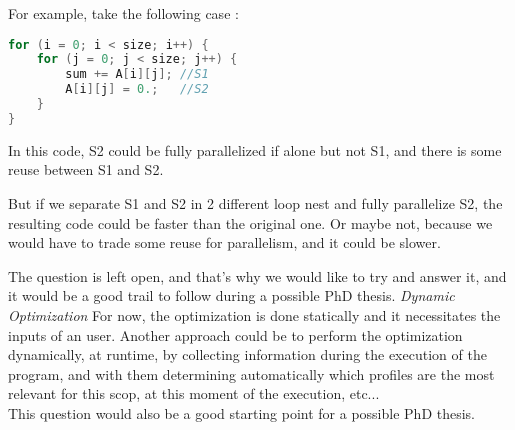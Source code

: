 \documentclass[paper=a4, fontsize=11.5pt]{scrartcl}
\numberwithin{equation}{section}        %
\numberwithin{figure}{section}          %
\numberwithin{table}{section}               %
\begin{document}
        For example, take the following case :
\begin{lstlisting}[frame=single, language=C, caption={Statements Separation example}, label={lst:stmt_sep_example}]
for (i = 0; i < size; i++) {
    for (j = 0; j < size; j++) {
        sum += A[i][j]; //S1
        A[i][j] = 0.;   //S2
    }
}
\end{lstlisting}
        In this code, S2 could be fully parallelized if alone but not S1, and there is
        some reuse between S1 and S2.

        But if we separate S1 and S2 in 2 different loop nest and fully parallelize S2,
        the resulting code could be faster than the original one. Or maybe not, because
        we would have to trade some reuse for parallelism, and it could be slower.
        
        The question is left open, and that's why we would like to try and answer it, and it
        would be a good trail to follow during a possible PhD thesis.
    \textit{Dynamic Optimization}
        For now, the optimization is done statically and it necessitates the inputs of an
        user. Another approach could be to perform the optimization dynamically, at runtime,
        by collecting information during the execution of the program, and with them
        determining automatically which profiles are the most relevant for this scop, at
        this moment of the execution, etc...\\
        This question would also be a good starting point for a possible PhD thesis.

            
\printglossary



\end{document}
